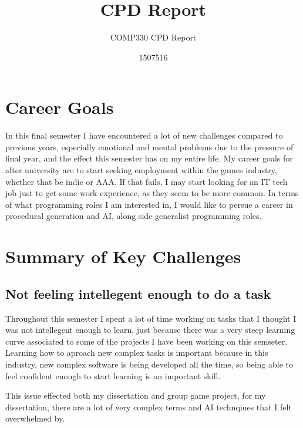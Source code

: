 \documentclass{scrartcl}
\title{CPD Report}
\subtitle{COMP330 CPD Report}
\author{1507516}
\begin{document}
\maketitle


\section{Career Goals}
In this final semester I have encountered a lot of new challenges compared to previous years, especially emotional and mental problems due to the pressure of final year, and the effect this semester has on my entire life.
My career goals for after university are to start seeking employment within the games industry, whether that be indie or AAA. If that fails, I may start looking for an IT tech job just to get some work experience, as they seem to be more common.
In terms of what programming roles I am interested in, I would like to persue a career in procedural generation and AI, along side generalist programming roles.

\section{Summary of Key Challenges}


\subsection{Not feeling intellegent enough to do a task}
Throughout this semester I spent a lot of time working on tasks that I thought I was not intellegent enough to learn, just because there was a very steep learning curve associated to some of the projects I have been working on this semseter.
Learning how to aproach new complex tasks is important because in this industry, new complex software is being developed all the time, so being able to feel confident enough to start learning is an important skill.
\par

This issue effected both my dissertation and group game project, for my dissertation, there are a lot of very complex terms and AI technqiues that I felt overwhelmed by.

\par
\end{document}

